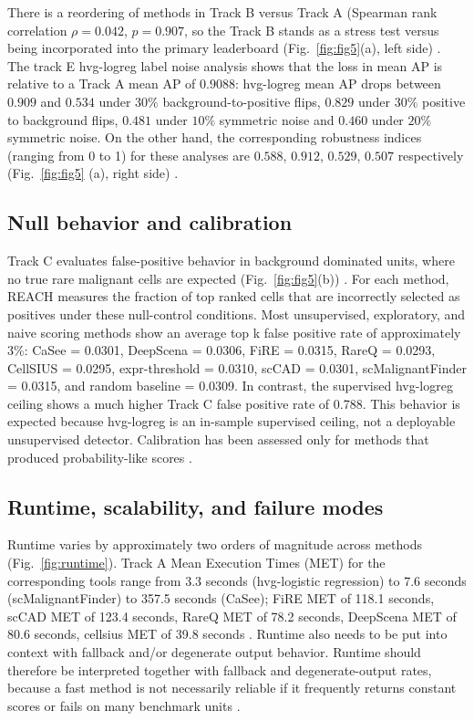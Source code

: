 \documentclass[10pt]{article}
\begin{document}
There is a reordering of methods in Track B versus Track A (Spearman rank correlation $\rho = 0.042$, $p = 0.907$, so the Track B stands as a stress test versus being incorporated into the primary leaderboard (Fig.~\ref{fig:fig5}(a), left side) \cite{cao2021benchmark}. The track E hvg-logreg label noise analysis shows that the loss in mean AP is relative to a Track A mean AP of $0.9088$: hvg-logreg mean AP drops between $0.909$ and $0.534$ under $30\% $ background-to-positive flips, $0.829$ under $30\%$ positive to background flips, $0.481$ under $10\%$ symmetric noise and $0.460$ under $20\%$ symmetric noise. On the other hand, the corresponding robustness indices (ranging from 0 to 1) for these analyses are $0.588$, $0.912$, $0.529$, $0.507$ respectively (Fig.~\ref{fig:fig5} (a), right side) \cite{mahalanabis2022evaluation}.

\subsection{Null behavior and calibration}

Track C evaluates false-positive behavior in background dominated units, where no true rare malignant cells are expected (Fig.~\ref{fig:fig5}(b)) \cite{torre2018rare}. For each method, REACH measures the fraction of top ranked cells that are incorrectly selected as positives under these null-control conditions. Most unsupervised, exploratory, and naive scoring methods show an average top k false positive rate of approximately 3\%: CaSee = 0.0301, DeepScena = 0.0306, FiRE = 0.0315, RareQ = 0.0293, CellSIUS = 0.0295, expr-threshold = 0.0310, scCAD = 0.0301, scMalignantFinder = 0.0315, and random baseline = 0.0309. In contrast, the supervised hvg-logreg ceiling shows a much higher Track C false positive rate of 0.788. This behavior is expected because hvg-logreg is an in-sample supervised ceiling, not a deployable unsupervised detector. Calibration has been assessed only for methods that produced probability-like scores \cite{christensen2023evaluation,abdelaal2019comparison}.

\subsection{Runtime, scalability, and failure modes}

Runtime varies by approximately two orders of magnitude across methods (Fig.~\ref{fig:runtime}). Track A Mean Execution Times (MET) for the corresponding tools range from 3.3 seconds (hvg-logistic regression) to 7.6 seconds (scMalignantFinder) to 357.5 seconds (CaSee); FiRE MET of 118.1 seconds, scCAD MET of 123.4 seconds, RareQ MET of 78.2 seconds, DeepScena MET of 80.6 seconds, cellsius MET of 39.8 seconds \cite{brendel2022application,wang2022comparison}. Runtime also needs to be put into context with fallback and/or degenerate output behavior. Runtime should therefore be interpreted together with fallback and degenerate-output rates, because a fast method is not necessarily reliable if it frequently returns constant scores or fails on many benchmark units \cite{everingham2010pascal,tran2020benchmark}.
\end{document}
